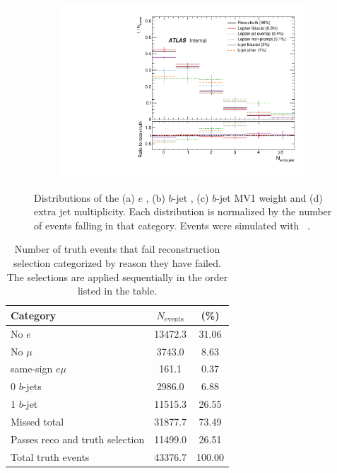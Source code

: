 \begin{figure}
\begin{subfigure}[]{0.45\textwidth}
\end{subfigure}
\begin{subfigure}[]{0.45\textwidth}
\includegraphics[width=\textwidth]{fig/RecoNotTruth/NJets.pdf}
\end{subfigure}
\caption{Distributions of the (a) $e$ \pt, (b) $b$-jet \pt, (c) $b$-jet MV1 weight and (d) extra jet multiplicity. Each distribution is normalized by the number of events falling in that category. Events were simulated with \powpy~\ttbar.}
\label{fig:reconottruth}
\end{figure}


\begin{table}
\begin{center}
\begin{tabular}{|l|cc|}
\hline
Category & $N_{\textrm{events}}$ & (\%) \\
\hline
No $e$ & 13472.3 &	31.06 \\
No $\mu$ & 3743.0 & 8.63 \\
same-sign $e\mu$ & 161.1 & 0.37 \\
0 $b$-jets & 2986.0	& 6.88 \\
1 $b$-jet  & 11515.3 & 26.55 \\
\hline
Missed total & 31877.7 & 73.49 \\
\hline \hline
Passes reco and truth selection & 11499.0 & 26.51 \\
\hline
Total truth events & 43376.7 & 100.00 \\
\hline

\end{tabular}
\caption{Number of truth events that fail reconstruction selection categorized by reason they have failed. The selections are applied sequentially in the order listed in the table.}
\label{t:truthnotreco}
\end{center}
\end{table}

